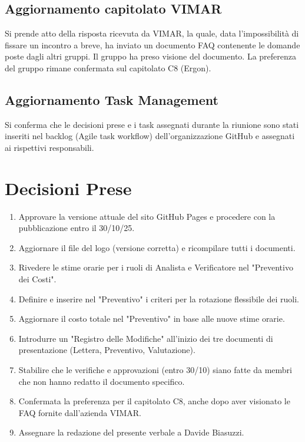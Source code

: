 \documentclass[a4paper, 11pt, oneside]{scrartcl} %
\begin{document}
\subsection{Aggiornamento capitolato VIMAR}
Si prende atto della risposta ricevuta da VIMAR, la quale, data l'impossibilità di fissare un incontro a breve, ha inviato un documento FAQ contenente le domande poste dagli altri gruppi.
Il gruppo ha preso visione del documento. La preferenza del gruppo rimane confermata sul capitolato C8 (Ergon).

\subsection{Aggiornamento Task Management}
Si conferma che le decisioni prese e i task assegnati durante la riunione sono stati inseriti nel backlog (Agile task workflow) dell'organizzazione GitHub e assegnati ai rispettivi responsabili.

\newpage
\section{Decisioni Prese}

\begin{enumerate}
    \item Approvare la versione attuale del sito GitHub Pages e procedere con la pubblicazione entro il 30/10/25.
    \item Aggiornare il file del logo (versione corretta) e ricompilare tutti i documenti.
    \item Rivedere le stime orarie per i ruoli di Analista e Verificatore nel "Preventivo dei Costi".
    \item Definire e inserire nel "Preventivo" i criteri per la rotazione flessibile dei ruoli.
    \item Aggiornare il costo totale nel "Preventivo" in base alle nuove stime orarie.
    \item Introdurre un "Registro delle Modifiche" all'inizio dei tre documenti di presentazione (Lettera, Preventivo, Valutazione).
    \item Stabilire che le verifiche e approvazioni (entro 30/10) siano fatte da membri che non hanno redatto il documento specifico.
    \item Confermata la preferenza per il capitolato C8, anche dopo aver visionato le FAQ fornite dall'azienda VIMAR.
    \item Assegnare la redazione del presente verbale a Davide Biasuzzi.
\end{enumerate}
\end{document}
